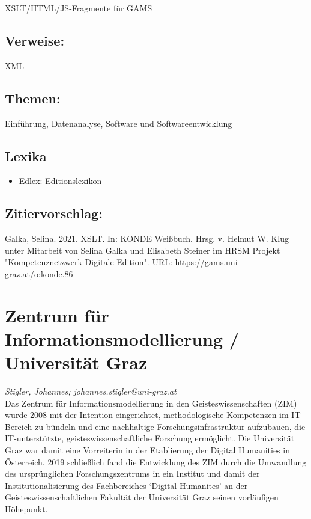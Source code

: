 \documentclass{article}
\begin{document}
{                           XSLT/HTML/JS-Fragmente für GAMS}\subsection*{Verweise:}\href{https://gams.uni-graz.at/o:konde.215}{XML}\subsection*{Themen:}Einführung, Datenanalyse, Software und Softwareentwicklung\subsection*{Lexika}\begin{itemize}\item \href{https://edlex.de/index.php?title=Extensible_Stylesheet_Language_(XSL)}{Edlex: Editionslexikon}\end{itemize}\subsection*{Zitiervorschlag:}Galka, Selina. 2021. XSLT. In: KONDE Weißbuch. Hrsg. v. Helmut W. Klug unter Mitarbeit von Selina Galka und Elisabeth Steiner im HRSM Projekt "Kompetenznetzwerk Digitale Edition". URL: https://gams.uni-graz.at/o:konde.86\newpage\section*{Zentrum für Informationsmodellierung / Universität Graz} \emph{Stigler, Johannes; johannes.stigler@uni-graz.at }\\
        
     Das Zentrum für Informationsmodellierung in den Geisteswissenschaften (ZIM) wurde
                  2008 mit der Intention eingerichtet, methodologische Kompetenzen im IT-Bereich zu
                  bündeln und eine nachhaltige Forschungsinfrastruktur aufzubauen, die
                  IT-unterstützte, geisteswissenschaftliche Forschung ermöglicht. Die Universität
                  Graz war damit eine Vorreiterin in der Etablierung der Digital Humanities in
                  Österreich. 2019 schließlich fand die Entwicklung des ZIM durch die Umwandlung des
                  ursprünglichen Forschungszentrums in ein Institut und damit der
                  Institutionalisierung des Fachbereiches ‘Digital Humanites’ an der
                  Geisteswissenschaftlichen Fakultät der Universität Graz seinen vorläufigen
                  Höhepunkt. \\
            
\end{document}
